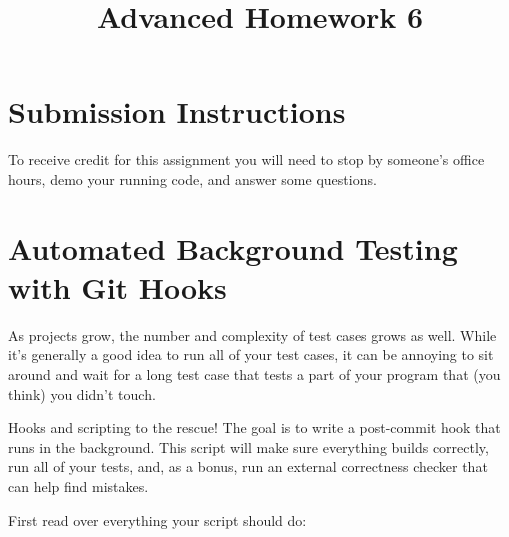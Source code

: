 \documentclass{article}
\begin{document}
\fancyfoot[C]{\color{gray} \thepage~/~\pageref*{LastPage}}
\pagestyle{fancyplain}


\title{\textbf{Advanced Homework 6\\}}
\author{\textbf{\color{red}{Due: Before February 25, 10:00PM}}}
\date{}
\maketitle


\section*{Submission Instructions}
To receive credit for this assignment you will need to stop by someone's
office hours, demo your running code, and answer some questions.

\section{Automated Background Testing with Git Hooks}

As projects grow, the number and complexity of test cases grows as well. While
it's generally a good idea to run all of your test cases, it can be annoying
to sit around and wait for a long test case that tests a part of your program
that (you think) you didn't touch.

\medskip
\noindent
Hooks and scripting to the rescue! The goal is to write a post-commit hook
that runs in the background. This script will make sure everything builds
correctly, run all of your tests, and, as a bonus, run an external correctness
checker that can help find mistakes.

\medskip
\noindent
First read over everything your script should do:
\end{document}
